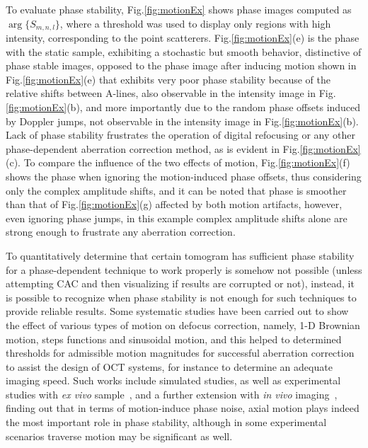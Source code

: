 To evaluate phase stability, Fig.\ref{fig:motionEx} shows phase images computed as $\arg\{S_{m,n,l}\}$, where a threshold was used to display only regions with high intensity, corresponding to the point scatterers. Fig.\ref{fig:motionEx}(e) is the phase with the static sample, exhibiting a stochastic but smooth behavior, distinctive of phase stable images, opposed to the phase image after inducing motion shown in Fig.\ref{fig:motionEx}(e) that exhibits very poor phase stability because of the relative shifts between A-lines, also observable in the intensity image in Fig.\ref{fig:motionEx}(b), and more importantly due to the random phase offsets induced by Doppler jumps, not observable in the intensity image in Fig.\ref{fig:motionEx}(b). Lack of phase stability frustrates the operation of digital refocusing or any other phase-dependent aberration correction method, as is evident in Fig.\ref{fig:motionEx}(c). To compare the influence of the two effects of motion, Fig.\ref{fig:motionEx}(f) shows the phase when ignoring the motion-induced phase offsets, thus considering only the complex amplitude shifts, and it can be noted that phase is smoother than that of Fig.\ref{fig:motionEx}(g) affected by both motion artifacts, however, even ignoring phase jumps, in this example complex amplitude shifts alone are strong enough to frustrate any aberration correction.

To quantitatively determine that certain tomogram has sufficient phase stability for a phase-dependent technique to work properly is somehow not possible (unless attempting CAC and then visualizing if results are corrupted or not), instead, it is possible to recognize when phase stability is not enough for such techniques to provide reliable results. Some systematic studies have been carried out to show the effect of various types of motion on defocus correction, namely, 1-D Brownian motion, steps functions and sinusoidal motion, and this helped to determined thresholds for admissible motion magnitudes for successful aberration correction to assist the design of OCT systems, for instance to determine an adequate imaging speed. Such works include simulated studies, as well as experimental studies with \textit{ex vivo} sample~\cite{Shemonski2014_Stability}, and a further extension with \textit{in vivo} imaging~\cite{Shemonski2014_Stability-1}, finding out that in terms of motion-induce phase noise, axial motion plays indeed the most important role in phase stability, although in some experimental scenarios traverse motion may be significant as well.

